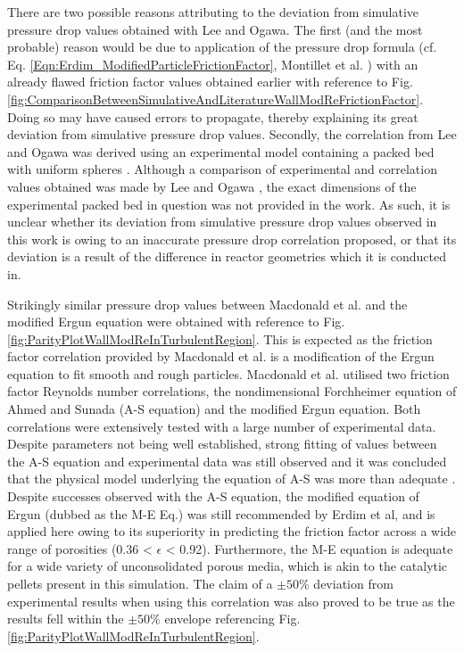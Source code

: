 There are two possible reasons attributing to the deviation from simulative pressure drop values obtained with Lee and Ogawa. The first (and the most probable) reason would be due to application of the pressure drop formula (cf. Eq. \ref{Eqn:Erdim_ModifiedParticleFrictionFactor}, Montillet et al. ) with an already flawed friction factor values obtained earlier with reference to Fig. \ref{fig:ComparisonBetweenSimulativeAndLiteratureWallModReFrictionFactor}. Doing so may have caused errors to propagate, thereby explaining its great deviation from simulative pressure drop values. Secondly, the correlation from Lee and Ogawa was derived using an experimental model containing a packed bed with uniform spheres \cite{Lee1994}.
Although a comparison of experimental and correlation values obtained was made by Lee and Ogawa \cite{Lee1994}, the exact dimensions of the experimental packed bed in question was not provided in the work. As such, it is unclear whether its deviation from simulative pressure drop values observed in this work is owing to an inaccurate pressure drop correlation proposed, or that its deviation is a result of the difference in reactor geometries which it is conducted in.

Strikingly similar pressure drop values between Macdonald et al. \cite{Macdonald1979} and the modified Ergun equation were obtained with reference to Fig. \ref{fig:ParityPlotWallModReInTurbulentRegion}. This is expected as the friction factor correlation provided by Macdonald et al. is a modification of the Ergun equation to fit smooth and rough particles. Macdonald et al. utilised two friction factor Reynolds number correlations, the nondimensional Forchheimer equation of Ahmed and Sunada (A-S equation) and the modified Ergun equation. Both correlations were extensively tested with a large number of experimental data. Despite parameters not being well established, strong fitting of values between the A-S equation and experimental data was still observed and it was concluded that the physical model underlying the equation of A-S was more than adequate \cite{Macdonald1979}. Despite successes observed with the A-S equation, the modified equation of Ergun (dubbed as the M-E Eq.) was still recommended by Erdim et al, and is applied here owing to its superiority in predicting the friction factor across a wide range of porosities (0.36 < $\epsilon$ < 0.92). Furthermore, the M-E equation is adequate for a wide variety of unconsolidated porous media, which is akin to the catalytic pellets present in this simulation. The claim of a $\pm50\%$ deviation from experimental results when using this correlation \cite{Macdonald1979} was also proved to be true as the results fell within the $\pm50\%$ envelope referencing Fig. \ref{fig:ParityPlotWallModReInTurbulentRegion}.

